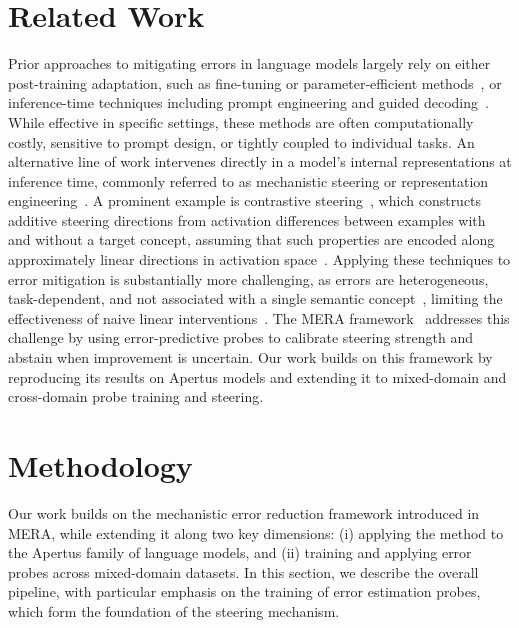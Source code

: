 \documentclass[sigconf]{acmart}
\begin{document}
\section{Related Work}
Prior approaches to mitigating errors in language models largely rely on either post-training adaptation, such as fine-tuning or parameter-efficient methods~\citep{hu2022lora, reft, lofit2024}, or inference-time techniques including prompt engineering and guided decoding~\citep{Kojima2022zeroshot, YangK21, decode1}. While effective in specific settings, these methods are often computationally costly, sensitive to prompt design, or tightly coupled to individual tasks. An alternative line of work intervenes directly in a model’s internal representations at inference time, commonly referred to as mechanistic steering or representation engineering~\citep{li2023inferencetime, belrose2023leace, fvs2023, sea2024, turner2024steeringlanguagemodelsactivation}. A prominent example is contrastive steering~\citep{refusal2024, steeringllama2024}, which constructs additive steering directions from activation differences between examples with and without a target concept, assuming that such properties are encoded along approximately linear directions in activation space~\citep{elhage2022superposition, tegmark2024geometrytruth}. Applying these techniques to error mitigation is substantially more challenging, as errors are heterogeneous, task-dependent, and not associated with a single semantic concept~\citep{adaptive2024, orgad2024}, limiting the effectiveness of naive linear interventions~\citep{belrose2023leace}. The MERA framework~\citep{hedstrom2025to} addresses this challenge by using error-predictive probes to calibrate steering strength and abstain when improvement is uncertain. Our work builds on this framework by reproducing its results on Apertus models and extending it to mixed-domain and cross-domain probe training and steering.


\section{Methodology}

Our work builds on the mechanistic error reduction framework introduced in MERA, while extending it along two key dimensions: (i) applying the method to the Apertus family of language models, and (ii) training and applying error probes across mixed-domain datasets. In this section, we describe the overall pipeline, with particular emphasis on the training of error estimation probes, which form the foundation of the steering mechanism.
\end{document}
